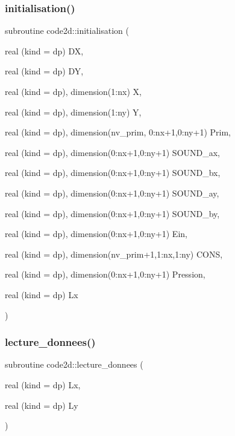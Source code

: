 \subsubsection{\texorpdfstring{initialisation()}{initialisation()}}
{\footnotesize\ttfamily subroutine code2d\+::initialisation (\begin{DoxyParamCaption}\item[{real (kind = dp)}]{DX,  }\item[{real (kind = dp)}]{DY,  }\item[{real (kind = dp), dimension(1\+:nx)}]{X,  }\item[{real (kind = dp), dimension(1\+:ny)}]{Y,  }\item[{real (kind = dp), dimension(nv\+\_\+prim, 0\+:nx+1,0\+:ny+1)}]{Prim,  }\item[{real (kind = dp), dimension(0\+:nx+1,0\+:ny+1)}]{S\+O\+U\+N\+D\+\_\+ax,  }\item[{real (kind = dp), dimension(0\+:nx+1,0\+:ny+1)}]{S\+O\+U\+N\+D\+\_\+bx,  }\item[{real (kind = dp), dimension(0\+:nx+1,0\+:ny+1)}]{S\+O\+U\+N\+D\+\_\+ay,  }\item[{real (kind = dp), dimension(0\+:nx+1,0\+:ny+1)}]{S\+O\+U\+N\+D\+\_\+by,  }\item[{real (kind = dp), dimension(0\+:nx+1,0\+:ny+1)}]{Ein,  }\item[{real (kind = dp), dimension(nv\+\_\+prim+1,1\+:nx,1\+:ny)}]{C\+O\+NS,  }\item[{real (kind = dp), dimension(0\+:nx+1,0\+:ny+1)}]{Pression,  }\item[{real (kind = dp)}]{Lx }\end{DoxyParamCaption})}

\mbox{\label{main2Dv1_01_07copy_08_8f90_a7e06ba833aef7743b6a2f1be79f4bc2e}} 
\subsubsection{\texorpdfstring{lecture\+\_\+donnees()}{lecture\_donnees()}}
{\footnotesize\ttfamily subroutine code2d\+::lecture\+\_\+donnees (\begin{DoxyParamCaption}\item[{real (kind = dp)}]{Lx,  }\item[{real (kind = dp)}]{Ly }\end{DoxyParamCaption})}

